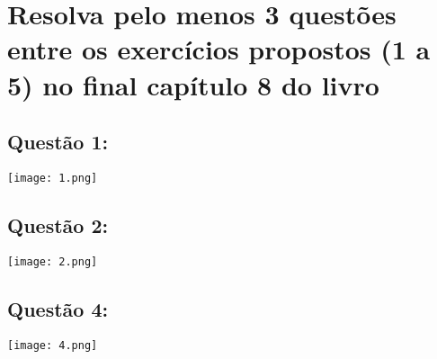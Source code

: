 \documentclass{article}
\begin{document}
\section{Resolva pelo menos 3 questões entre os exercícios propostos (1 a 5) no final capítulo 8 do livro}
\subsection{Questão 1:}
\texttt{[image: 1.png]}
\subsection{Questão 2:}
\texttt{[image: 2.png]}
\subsection{Questão 4:}
\texttt{[image: 4.png]}
\end{document}
